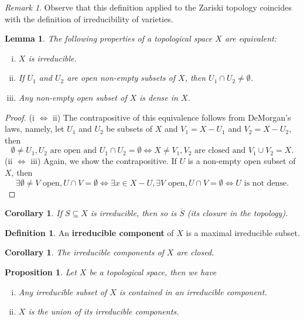 \documentclass{tufte-handout} %
\newtheorem{cor}[thm]{Corollary}
\newtheorem{prop}[thm]{Proposition}
\newtheorem{lem}[thm]{Lemma}
\theoremstyle{definition}
\newtheorem{defn}[thm]{Definition}
\theoremstyle{remark}
\newtheorem{rem}[thm]{Remark}
\begin{document}
\begin{rem}
	Observe that this definition applied to the Zariski topology coincides with the definition of irreducibility of varieties.
\end{rem}
\begin{lem}\label{lemequivirred}
	The following properties of a topological space $X$ are equivalent:
	\begin{enumerate}[(i)]
		\item $X$ is irreducible.
		\item If $U_1$ and $U_2$ are open non-empty subsets of $X$, then $U_1 \cap U_2 \neq \emptyset$.
		\item Any non-empty open subset of $X$ is dense in $X$.
	\end{enumerate}
\end{lem}
\begin{proof}
	(i $\Leftrightarrow$ ii) The contrapositive of this equivalence follows from DeMorgan's laws, namely, let $U_1$ and $U_2$ be subsets of $X$ and $V_1 = X-U_1$ and $V_2 = X-U_2$, then \[\emptyset \neq U_1, U_2 \text{ are open and } U_1 \cap U_2 = \emptyset \Leftrightarrow X \neq V_1, V_2 \text{ are closed and } V_1 \cup V_2 = X.\]
	(ii $\Leftrightarrow$ iii) Again, we show the contrapositive. If $U$ is a non-empty open subset of $X$, then 
	\[\exists \emptyset \neq V \text{ open}, U \cap V = \emptyset \Leftrightarrow \exists x \in X-U, \exists V \text{ open}, U \cap V = \emptyset \Leftrightarrow U \text{ is not dense.}\]
\end{proof}
\begin{cor}
	If $S\subseteq X$ is irreducible, then so is $\overline{S}$ (its closure in the topology).
\end{cor}
\begin{defn}
	An \textbf{irreducible component} of $X$ is a maximal irreducible subset.
\end{defn}
\begin{cor}
	The irreducible components of $X$ are closed.
\end{cor}
\begin{prop}
	Let $X$ be a topological space, then we have
	\begin{enumerate}[(i)]
		\item Any irreducible subset of $X$ is contained in an irreducible component.
		\item $X$ is the union of its irreducible components.
	\end{enumerate}
\end{prop}
\end{document}
